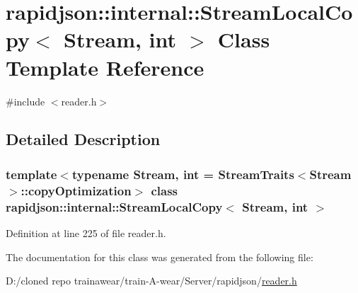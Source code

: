\hypertarget{classrapidjson_1_1internal_1_1_stream_local_copy}{}\section{rapidjson\+::internal\+::Stream\+Local\+Copy$<$ Stream, int $>$ Class Template Reference}
\label{classrapidjson_1_1internal_1_1_stream_local_copy}


{\ttfamily \#include $<$reader.\+h$>$}



\subsection{Detailed Description}
\subsubsection*{template$<$typename Stream, int = Stream\+Traits$<$\+Stream$>$\+::copy\+Optimization$>$\newline
class rapidjson\+::internal\+::\+Stream\+Local\+Copy$<$ Stream, int $>$}



Definition at line 225 of file reader.\+h.



The documentation for this class was generated from the following file\+:\begin{DoxyCompactItemize}
\item 
D\+:/cloned repo trainawear/train-\/\+A-\/wear/\+Server/rapidjson/\mbox{\hyperlink{reader_8h}{reader.\+h}}\end{DoxyCompactItemize}
